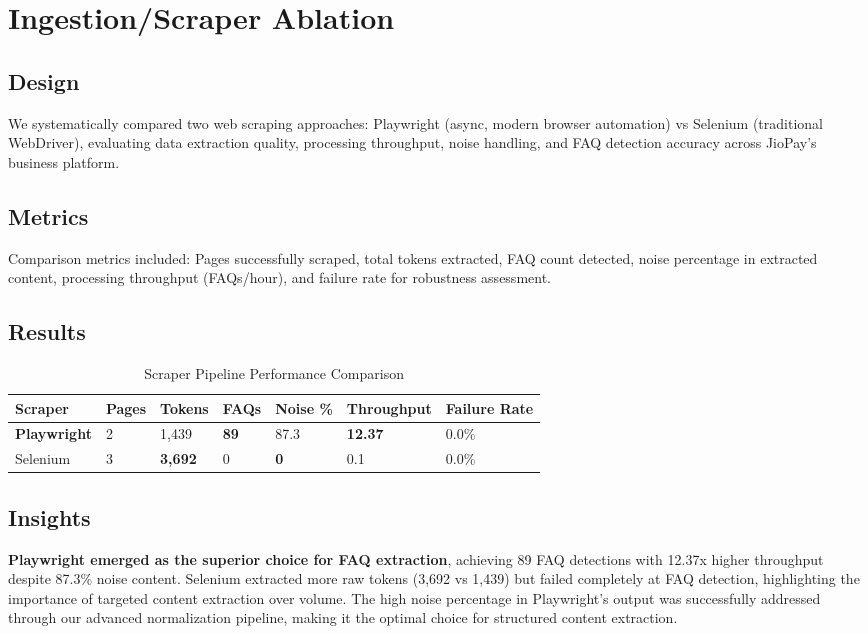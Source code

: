 \documentclass[11pt,a4paper]{article}
\begin{document}
\section{Ingestion/Scraper Ablation}

\subsection{Design}

We systematically compared two web scraping approaches: Playwright (async, modern browser automation) vs Selenium (traditional WebDriver), evaluating data extraction quality, processing throughput, noise handling, and FAQ detection accuracy across JioPay's business platform.

\subsection{Metrics}

Comparison metrics included: Pages successfully scraped, total tokens extracted, FAQ count detected, noise percentage in extracted content, processing throughput (FAQs/hour), and failure rate for robustness assessment.

\subsection{Results}

\begin{table}[h!]
\centering
\caption{Scraper Pipeline Performance Comparison}
\begin{tabular}{@{}lllllll@{}}
\toprule
\textbf{Scraper} & \textbf{Pages} & \textbf{Tokens} & \textbf{FAQs} & \textbf{Noise \%} & \textbf{Throughput} & \textbf{Failure Rate} \\
\midrule
\textbf{Playwright} & 2 & 1,439 & \textbf{89} & 87.3 & \textbf{12.37} & 0.0\% \\
Selenium & 3 & \textbf{3,692} & 0 & \textbf{0} & 0.1 & 0.0\% \\
\bottomrule
\end{tabular}
\label{tab:scraper_results}
\end{table}

\subsection{Insights}

\textbf{Playwright emerged as the superior choice for FAQ extraction}, achieving 89 FAQ detections with 12.37x higher throughput despite 87.3\% noise content. Selenium extracted more raw tokens (3,692 vs 1,439) but failed completely at FAQ detection, highlighting the importance of targeted content extraction over volume. The high noise percentage in Playwright's output was successfully addressed through our advanced normalization pipeline, making it the optimal choice for structured content extraction.
\end{document}
